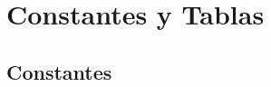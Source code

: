 \documentclass[notebook.tex]{subfiles}
\begin{document}
\section{Constantes y Tablas}

\subsection{Constantes}

\end{document}
